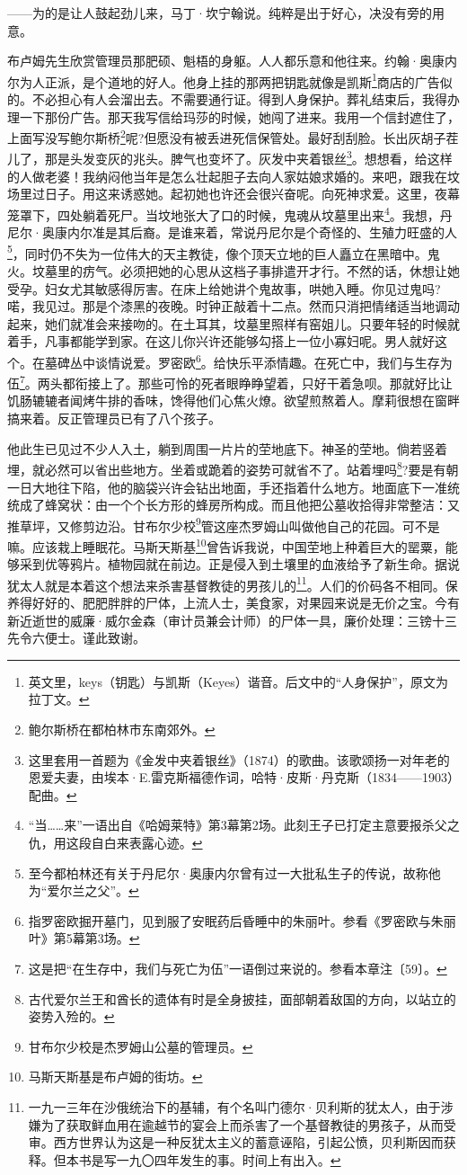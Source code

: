\par ——为的是让人鼓起劲儿来，马丁·坎宁翰说。纯粹是出于好心，决没有旁的用意。
\par 布卢姆先生欣赏管理员那肥硕、魁梧的身躯。人人都乐意和他往来。约翰·奥康内尔为人正派，是个道地的好人。他身上挂的那两把钥匙就像是凯斯\footnote{英文里，keys（钥匙）与凯斯（Keyes）谐音。后文中的“人身保护”，原文为拉丁文。}商店的广告似的。不必担心有人会溜出去。不需要通行证。得到人身保护。葬礼结束后，我得办理一下那份广告。那天我写信给玛莎的时候，她闯了进来。我用一个信封遮住了，上面写没写鲍尔斯桥\footnote{鲍尔斯桥在都柏林市东南郊外。}呢?但愿没有被丢进死信保管处。最好刮刮脸。长出灰胡子茬儿了，那是头发变灰的兆头。脾气也变坏了。灰发中夹着银丝\footnote{这里套用一首题为《金发中夹着银丝》（1874）的歌曲。该歌颂扬一对年老的恩爱夫妻，由埃本·E.雷克斯福德作词，哈特·皮斯·丹克斯（1834——1903）配曲。}。想想看，给这样的人做老婆！我纳闷他当年是怎么壮起胆子去向人家姑娘求婚的。来吧，跟我在坟场里过日子。用这来诱惑她。起初她也许还会很兴奋呢。向死神求爱。这里，夜幕笼罩下，四处躺着死尸。当坟地张大了口的时候，鬼魂从坟墓里出来\footnote{“当……来”一语出自《哈姆莱特》第3幕第2场。此刻王子已打定主意要报杀父之仇，用这段自白来表露心迹。}。我想，丹尼尔·奥康内尔准是其后裔。是谁来着，常说丹尼尔是个奇怪的、生殖力旺盛的人\footnote{至今都柏林还有关于丹尼尔·奥康内尔曾有过一大批私生子的传说，故称他为“爱尔兰之父”。}，同时仍不失为一位伟大的天主教徒，像个顶天立地的巨人矗立在黑暗中。鬼火。坟墓里的疠气。必须把她的心思从这档子事排遣开才行。不然的话，休想让她受孕。妇女尤其敏感得厉害。在床上给她讲个鬼故事，哄她入睡。你见过鬼吗?喏，我见过。那是个漆黑的夜晚。时钟正敲着十二点。然而只消把情绪适当地调动起来，她们就准会来接吻的。在土耳其，坟墓里照样有窑姐儿。只要年轻的时候就着手，凡事都能学到家。在这儿你兴许还能够勾搭上一位小寡妇呢。男人就好这个。在墓碑丛中谈情说爱。罗密欧\footnote{指罗密欧掘开墓门，见到服了安眠药后昏睡中的朱丽叶。参看《罗密欧与朱丽叶》第5幕第3场。}。给快乐平添情趣。在死亡中，我们与生存为伍\footnote{这是把“在生存中，我们与死亡为伍”一语倒过来说的。参看本章注〔59〕。}。两头都衔接上了。那些可怜的死者眼睁睁望着，只好干着急呗。那就好比让饥肠辘辘者闻烤牛排的香味，馋得他们心焦火燎。欲望煎熬着人。摩莉很想在窗畔搞来着。反正管理员已有了八个孩子。
\par 他此生已见过不少人入土，躺到周围一片片的茔地底下。神圣的茔地。倘若竖着埋，就必然可以省出些地方。坐着或跪着的姿势可就省不了。站着埋吗\footnote{古代爱尔兰王和酋长的遗体有时是全身披挂，面部朝着敌国的方向，以站立的姿势入殓的。}?要是有朝一日大地往下陷，他的脑袋兴许会钻出地面，手还指着什么地方。地面底下一准统统成了蜂窝状：由一个个长方形的蜂房所构成。而且他把公墓收拾得非常整洁：又推草坪，又修剪边沿。甘布尔少校\footnote{甘布尔少校是杰罗姆山公墓的管理员。}管这座杰罗姆山叫做他自己的花园。可不是嘛。应该栽上睡眠花。马斯天斯基\footnote{马斯天斯基是布卢姆的街坊。}曾告诉我说，中国茔地上种着巨大的罂粟，能够采到优等鸦片。植物园就在前边。正是侵入到土壤里的血液给予了新生命。据说犹太人就是本着这个想法来杀害基督教徒的男孩儿的\footnote{一九一三年在沙俄统治下的基辅，有个名叫门德尔·贝利斯的犹太人，由于涉嫌为了获取鲜血用在逾越节的宴会上而杀害了一个基督教徒的男孩子，从而受审。西方世界认为这是一种反犹太主义的蓄意诬陷，引起公愤，贝利斯因而获释。但本书是写一九〇四年发生的事。时间上有出入。}。人们的价码各不相同。保养得好好的、肥肥胖胖的尸体，上流人士，美食家，对果园来说是无价之宝。今有新近逝世的威廉·威尔金森（审计员兼会计师）的尸体一具，廉价处理：三镑十三先令六便士。谨此致谢。
